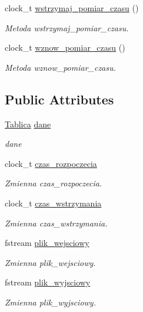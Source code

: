 \begin{DoxyCompactItemize}
clock\+\_\+t \hyperlink{class_program_aac837dd96e761e55fd3faa2b197635fc}{wstrzymaj\+\_\+pomiar\+\_\+czasu} ()
\begin{DoxyCompactList}\small\item\em Metoda wstrzymaj\+\_\+pomiar\+\_\+czasu. \end{DoxyCompactList}\item 
clock\+\_\+t \hyperlink{class_program_a7c069b25265a74e466ac9b868fcf0a9d}{wznow\+\_\+pomiar\+\_\+czasu} ()
\begin{DoxyCompactList}\small\item\em Metoda wznow\+\_\+pomiar\+\_\+czasu. \end{DoxyCompactList}\end{DoxyCompactItemize}
\subsection*{Public Attributes}
\begin{DoxyCompactItemize}
\item 
\hyperlink{class_tablica}{Tablica} \hyperlink{class_program_ac27fc896de0e4c87cc6a17290c0930ef}{dane}
\begin{DoxyCompactList}\small\item\em dane \end{DoxyCompactList}\item 
clock\+\_\+t \hyperlink{class_program_a8cdcc795adc329732f41b399044d0a5b}{czas\+\_\+rozpoczecia}
\begin{DoxyCompactList}\small\item\em Zmienna czas\+\_\+rozpoczecia. \end{DoxyCompactList}\item 
clock\+\_\+t \hyperlink{class_program_aded0e8c471b06c63a58d47994ddac83f}{czas\+\_\+wstrzymania}
\begin{DoxyCompactList}\small\item\em Zmienna czas\+\_\+wstrzymania. \end{DoxyCompactList}\item 
fstream \hyperlink{class_program_a532ceacb1d70da66142bab96a3eb0753}{plik\+\_\+wejsciowy}
\begin{DoxyCompactList}\small\item\em Zmienna plik\+\_\+wejsciowy. \end{DoxyCompactList}\item 
fstream \hyperlink{class_program_aaa305591a4333d799c8d353f3072d8e0}{plik\+\_\+wyjsciowy}
\begin{DoxyCompactList}\small\item\em Zmienna plik\+\_\+wyjsciowy. \end{DoxyCompactList}\end{DoxyCompactItemize}


